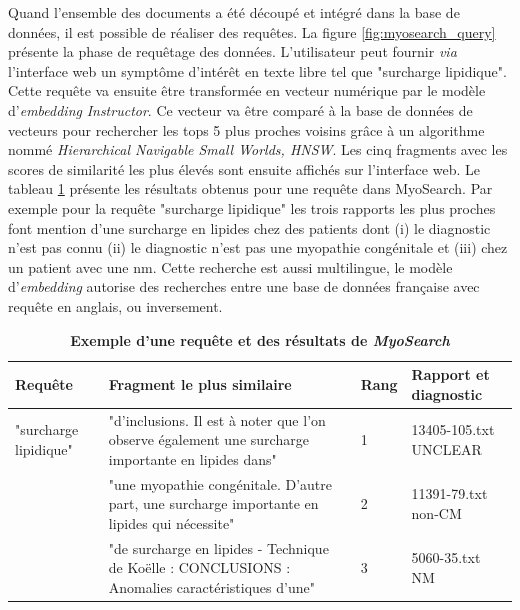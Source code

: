 Quand l'ensemble des documents a été découpé et intégré dans la base de données, il est possible de réaliser des requêtes. La figure \ref{fig:myosearch_query} présente la phase de requêtage des données. L'utilisateur peut fournir \textit{via} l'interface web un symptôme d'intérêt en texte libre tel que "surcharge lipidique". Cette requête va ensuite être transformée en vecteur numérique par le modèle d'\textit{embedding }\textit{Instructor}. Ce vecteur va être comparé à la base de données de vecteurs pour rechercher les tops 5 plus proches voisins grâce à un algorithme nommé \textit{Hierarchical Navigable Small Worlds, HNSW}. Les cinq fragments avec les scores de similarité les plus élevés sont ensuite affichés sur l'interface web. Le tableau \ref{tab:myosearch_results} présente les résultats obtenus pour une requête dans MyoSearch. Par exemple pour la requête "surcharge lipidique" les trois rapports les plus proches font mention d'une surcharge en lipides chez des patients dont (i) le diagnostic n'est pas connu (ii) le diagnostic n'est pas une myopathie congénitale et (iii) chez un patient avec une \gls{nm}. Cette recherche est aussi multilingue, le modèle d'\textit{embedding} autorise des recherches entre une base de données française avec requête en anglais, ou inversement.
\begin{table}[!ht]
\centering
\caption[Exemple d'une requête et des résultats de \textit{MyoSearch}]{\textbf{Exemple d'une requête et des résultats de \textit{MyoSearch}}}
\label{tab:myosearch_results}
\begin{tabularx}{\textwidth}{|l|X|p{1cm}|p{2cm}|}
\hline
\textbf{Requête} & \textbf{Fragment le plus similaire} & \textbf{Rang} & \textbf{Rapport et diagnostic} \\\hline
"surcharge lipidique" & "d’inclusions. Il est à noter que l’on observe également une surcharge importante en lipides dans" \newline & 1 & 13405-105.txt UNCLEAR \\
 & "une myopathie congénitale. D'autre part, une surcharge importante en lipides qui nécessite"\newline & 2 & 11391-79.txt non-CM \\
 & "de surcharge en lipides - Technique de Koëlle : CONCLUSIONS : Anomalies caractéristiques d’une" & 3 & 5060-35.txt NM \\ \hline
\end{tabularx}
\end{table}

